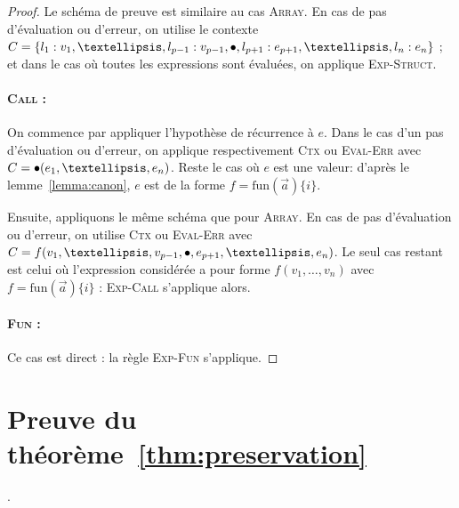 \begin{proof}
Le schéma de preuve est similaire au cas \textsc{Array}.
En cas de pas d'évaluation ou d'erreur, on utilise le contexte
$C = \eStruct{l_1: v_1, …, l_{p-1}: v_{p-1}, \ctxEmpty, l_{p+1}: e_{p+1}, …, l_n:
e_n}$ ; et dans le cas où toutes les expressions sont évaluées, on applique
\textsc{Exp-Struct}.

\paragraph{\textsc{Call} :} %

On commence par appliquer l'hypothèse de récurrence à $e$. Dans le cas d'un pas
d'évaluation ou d'erreur, on applique respectivement \textsc{Ctx} ou
\textsc{Eval-Err} avec $C = \ctxEmpty (e_1, …, e_n)$.
Reste le cas où $e$ est une valeur: d'après le lemme~\ref{lemma:canon}, $e$ est
de la forme $f = \mathrm{fun} (\vec{a}) \{i\}$.

Ensuite, appliquons le même schéma que pour \textsc{Array}.
En cas de pas d'évaluation ou d'erreur, on utilise
\textsc{Ctx} ou \textsc{Eval-Err} avec
$C = f (v_1, …, v_{p-1}, \ctxEmpty, e_{p+1}, …, e_n)$.
Le seul cas restant est celui où l'expression considérée a pour forme
$f (v_1, …, v_n)$
avec
$f = \mathrm{fun} (\vec{a}) \{i\}$
:
\textsc{Exp-Call} s'applique alors.


\paragraph{\textsc{Fun} :} %

Ce cas est direct : la règle \textsc{Exp-Fun} s'applique.

\end{proof}

\section{Preuve du théorème~\ref{thm:preservation}}
\label{proof:preservation}.

